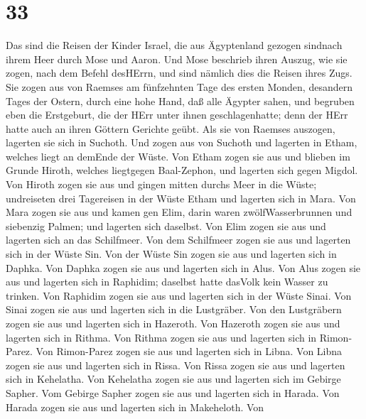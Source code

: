 \hypertarget{section-32}{%
\section{33}\label{section-32}}

 Das sind die Reisen der Kinder Israel, die aus Ägyptenland
gezogen sindnach ihrem Heer durch Mose und Aaron.  Und Mose
beschrieb ihren Auszug, wie sie zogen, nach dem Befehl desHErrn, und
sind nämlich dies die Reisen ihres Zugs.  Sie zogen aus von
Raemses am fünfzehnten Tage des ersten Monden, desandern Tages der
Ostern, durch eine hohe Hand, daß alle Ägypter sahen,  und
begruben eben die Erstgeburt, die der HErr unter ihnen geschlagenhatte;
denn der HErr hatte auch an ihren Göttern Gerichte geübt. 
Als sie von Raemses auszogen, lagerten sie sich in Suchoth. 
Und zogen aus von Suchoth und lagerten in Etham, welches liegt an
demEnde der Wüste.  Von Etham zogen sie aus und blieben im
Grunde Hiroth, welches liegtgegen Baal-Zephon, und lagerten sich gegen
Migdol.  Von Hiroth zogen sie aus und gingen mitten durchs
Meer in die Wüste; undreiseten drei Tagereisen in der Wüste Etham und
lagerten sich in Mara.  Von Mara zogen sie aus und kamen gen
Elim, darin waren zwölfWasserbrunnen und siebenzig Palmen; und lagerten
sich daselbst.  Von Elim zogen sie aus und lagerten sich an
das Schilfmeer.  Von dem Schilfmeer zogen sie aus und
lagerten sich in der Wüste Sin.  Von der Wüste Sin zogen
sie aus und lagerten sich in Daphka.  Von Daphka zogen sie
aus und lagerten sich in Alus.  Von Alus zogen sie aus und
lagerten sich in Raphidim; daselbst hatte dasVolk kein Wasser zu
trinken.  Von Raphidim zogen sie aus und lagerten sich in
der Wüste Sinai.  Von Sinai zogen sie aus und lagerten sich
in die Lustgräber.  Von den Lustgräbern zogen sie aus und
lagerten sich in Hazeroth.  Von Hazeroth zogen sie aus und
lagerten sich in Rithma.  Von Rithma zogen sie aus und
lagerten sich in Rimon-Parez.  Von Rimon-Parez zogen sie
aus und lagerten sich in Libna.  Von Libna zogen sie aus
und lagerten sich in Rissa.  Von Rissa zogen sie aus und
lagerten sich in Kehelatha.  Von Kehelatha zogen sie aus
und lagerten sich im Gebirge Sapher.  Vom Gebirge Sapher
zogen sie aus und lagerten sich in Harada.  Von Harada
zogen sie aus und lagerten sich in Makeheloth.  Von
